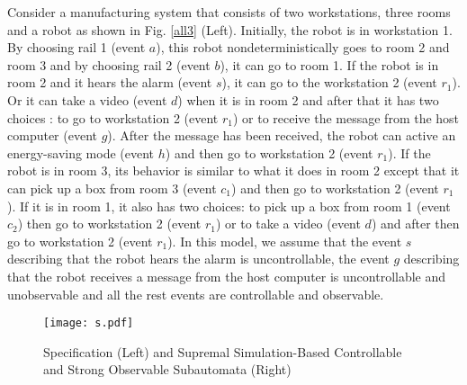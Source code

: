 \documentclass[12pt,draftcls,onecolumn]{IEEEtran}
\begin{document}
Consider a manufacturing system that consists of two workstations,
three rooms and a robot as shown in Fig. \ref{all3} (Left).
Initially, the robot is in workstation 1. By choosing rail 1 (event
$a$), this robot nondeterministically goes to room 2 and room 3 and
by choosing rail 2 (event $b$), it can go to room 1. If the robot is
in room 2 and it hears the alarm (event $s$), it can go to the
workstation 2 (event $r_1$). Or it can take a video (event $d$) when
it is in room 2 and after that it has two choices : to go to
workstation 2 (event $r_1$) or to receive the message from the host
computer (event $g$). After the message has been received, the robot
can active an energy-saving mode (event $h$) and then go to
workstation 2 (event $r_1$). If the robot is in room 3, its behavior
is similar to what it does in room 2 except that it can pick up a
box from room 3 (event $c_1$) and then go to workstation 2 (event
$r_1$). If it is in room 1, it also has two choices: to pick up a
box from room 1 (event $c_2$) then go to workstation 2 (event $r_1$)
or to take a video (event $d$) and after then go to workstation 2
(event $r_1$). In this model, we assume that the event $s$
describing that the robot hears the alarm is uncontrollable, the
event $g$ describing that the robot receives a message from the host
computer is uncontrollable and unobservable and all the rest events
are controllable and observable.



\begin{figure}[!htb]
\begin{center}
\texttt{[image: s.pdf]}
\caption{Specification (Left) and Supremal Simulation-Based
Controllable and Strong Observable Subautomata (Right)} \label{all4}
\end{center}
\end{figure}
\end{document}
